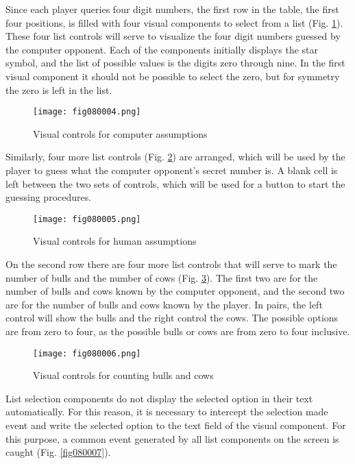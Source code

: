 Since each player queries four digit numbers, the first row in the table, the first four positions, is filled with four visual components to select from a list (Fig. \ref{fig080004}). These four list controls will serve to visualize the four digit numbers guessed by the computer opponent. Each of the components initially displays the star symbol, and the list of possible values is the digits zero through nine. In the first visual component it should not be possible to select the zero, but for symmetry the zero is left in the list.

\begin{figure}[H]
   \centering
   \texttt{[image: fig080004.png]}
   \caption{Visual controls for computer assumptions}
\label{fig080004}
\end{figure}

Similarly, four more list controls (Fig. \ref{fig080005}) are arranged, which will be used by the player to guess what the computer opponent's secret number is. A blank cell is left between the two sets of controls, which will be used for a button to start the guessing procedures.

\begin{figure}[H]
   \centering
   \texttt{[image: fig080005.png]}
   \caption{Visual controls for human assumptions}
\label{fig080005}
\end{figure}

On the second row there are four more list controls that will serve to mark the number of bulls and the number of cows (Fig. \ref{fig080006}). The first two are for the number of bulls and cows known by the computer opponent, and the second two are for the number of bulls and cows known by the player. In pairs, the left control will show the bulls and the right control the cows. The possible options are from zero to four, as the possible bulls or cows are from zero to four inclusive.

\begin{figure}[H]
   \centering
   \texttt{[image: fig080006.png]}
   \caption{Visual controls for counting bulls and cows}
\label{fig080006}
\end{figure}

List selection components do not display the selected option in their text automatically. For this reason, it is necessary to intercept the selection made event and write the selected option to the text field of the visual component. For this purpose, a common event generated by all list components on the screen is caught (Fig. \ref{fig080007}).


